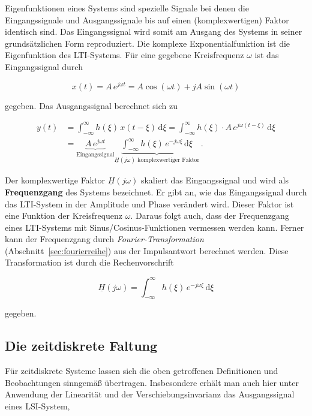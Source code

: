 Eigenfunktionen eines Systems sind spezielle Signale bei denen die Eingangssignale und Ausgangssignale bis auf einen (komplexwertigen) Faktor identisch sind. Das Eingangssignal wird somit am Ausgang des Systems in seiner grundsätzlichen Form reproduziert. Die komplexe Exponentialfunktion ist die Eigenfunktion des LTI-Systems. Für eine gegebene Kreisfrequenz $\omega$ ist das Eingangssignal durch

$$
x(t) = A\,e^{j\omega t} = A\cos(\omega t) + jA\sin(\omega t)
$$

gegeben. Das Ausgangssignal berechnet sich zu

\begin{align*}
y(t) &= \int_{-\infty}^{\infty} h(\xi)\,x(t - \xi)\,\mathrm{d}\xi = \int_{-\infty}^{\infty} h(\xi)\cdot A\,e^{j\omega(t-\xi)}\,\mathrm{d}\xi \\
&= \underbrace{A\,e^{j\omega t}}_{\text{Eingangssignal}}\underbrace{\int_{-\infty}^{\infty} h(\xi)\,e^{-j\omega\xi}\,\mathrm{d}\xi}_{\underline{H}(j\omega)\text{ komplexwertiger Faktor}}\,.
\end{align*}

\begin{definition}[Frequenzgang]
Der komplexwertige Faktor $\underline{H}(j\omega)$ skaliert das Eingangssignal und wird als \textbf{Frequenzgang} des Systems bezeichnet. Er gibt an, wie das Eingangssignal durch das LTI-System in der Amplitude und Phase verändert wird. Dieser Faktor ist eine Funktion der Kreisfrequenz $\omega$. Daraus folgt auch, dass der Frequenzgang eines LTI-Systems mit Sinus/Cosinus-Funktionen vermessen werden kann. Ferner kann der Frequenzgang durch \textit{Fourier-Transformation} (Abschnitt~\ref{sec:fourierreihe}) aus der Impulsantwort berechnet werden. Diese Transformation ist durch die Rechenvorschrift

$$
\underline{H}(j\omega) = \int_{-\infty}^{\infty} h(\xi)\,e^{-j\omega\xi}\,\mathrm{d}\xi
$$

gegeben.
\end{definition}

\subsection{Die zeitdiskrete Faltung}
\label{sec:diskrete-faltung}

Für zeitdiskrete Systeme lassen sich die oben getroffenen Definitionen und Beobachtungen sinngemäß übertragen. Insbesondere erhält man auch hier unter Anwendung der Linearität und der Verschiebungsinvarianz das Ausgangssignal eines LSI-System,

